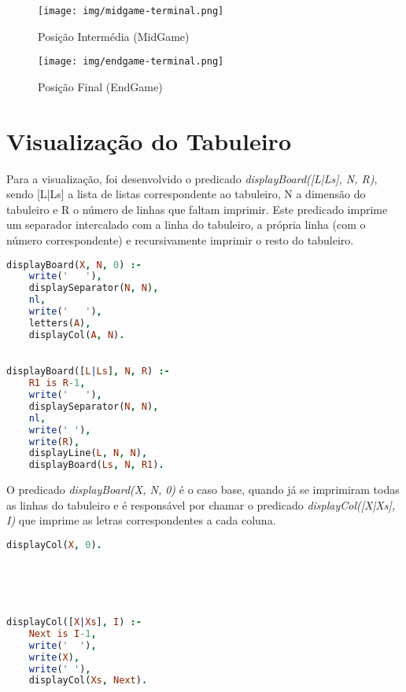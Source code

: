 \documentclass[a4paper]{article}
\begin{document}
\begin{figure}[h!]
\centering
\begin{minipage}{.4\textwidth}
  \centering
  \texttt{[image: img/midgame-terminal.png]}
  \caption{Posição Intermédia (MidGame)}
  \label{fig:mid}
\end{minipage}%
\begin{minipage}{.4\textwidth}
  \centering
  \texttt{[image: img/endgame-terminal.png]}
  \caption{Posição Final (EndGame)}
  \label{fig:end}
\end{minipage}
\end{figure}
\newpage
\section{Visualização do Tabuleiro}

Para a visualização, foi desenvolvido o predicado \textit{displayBoard([L|Ls], N, R)}, sendo [L|Ls] a lista de listas correspondente ao tabuleiro, N a dimensão do tabuleiro e R o número de linhas que faltam imprimir. Este predicado imprime um separador intercalado com a linha do tabuleiro, a própria linha (com o número correspondente) e recursivamente imprimir o resto do tabuleiro.

\begin{multicols}{2}
\begin{lstlisting}[language=Prolog]
displayBoard(X, N, 0) :- 
	write('   '), 
	displaySeparator(N, N), 
	nl, 
	write('   '), 
	letters(A), 
	displayCol(A, N).
	

displayBoard([L|Ls], N, R) :- 
	R1 is R-1,
	write('   '), 
	displaySeparator(N, N),
	nl, 
	write(' '), 
	write(R),
	displayLine(L, N, N),
	displayBoard(Ls, N, R1).
\end{lstlisting}
\end{multicols}

O predicado \textit{displayBoard(X, N, 0)} é o caso base, quando já se imprimiram todas as linhas do tabuleiro e é responsável por chamar o predicado \textit{displayCol([X|Xs], I)} que imprime as letras correspondentes a cada coluna.

\begin{multicols}{2}
\begin{lstlisting}[language=Prolog]
displayCol(X, 0).





displayCol([X|Xs], I) :- 
	Next is I-1, 
	write('  '), 
	write(X), 
	write(' '), 
	displayCol(Xs, Next).
\end{lstlisting}
\end{multicols}
\end{document}
